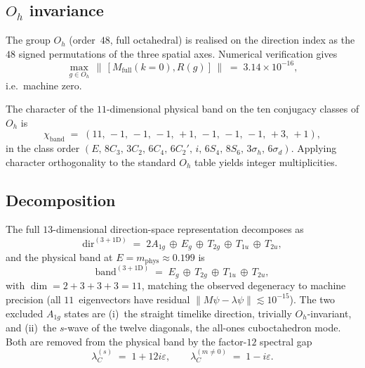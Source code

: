 \documentclass[twocolumn,showpacs,preprintnumbers,amsmath,amssymb]{revtex4-2}
\newcommand{\eps}{\varepsilon}
\newcommand{\mphys}{m_{\mathrm{phys}}}
\newcommand{\Oh}{O_{h}}
\begin{document}
\subsection{$\Oh$ invariance}

The group $\Oh$ (order~$48$, full octahedral) is realised on the direction
index as the $48$ signed permutations of the three spatial axes.
Numerical verification gives
\begin{equation}
  \max_{g\in\Oh}\,\bigl\lVert\,[M_{\mathrm{full}}(k=0),R(g)]\,\bigr\rVert
  \;=\; 3.14\times 10^{-16},
\end{equation}
i.e.\ machine zero.

The character of the $11$-dimensional physical band on the ten conjugacy
classes of $\Oh$ is
\begin{equation}
  \chi_{\text{band}} \;=\;
    (11,\,-1,\,-1,\,-1,\,+1,\,-1,\,-1,\,-1,\,+3,\,+1),
\end{equation}
in the class order $(E,\,8C_{3},\,3C_{2},\,6C_{4},\,6C_{2}',\,i,\,6S_{4},
\,8S_{6},\,3\sigma_{h},\,6\sigma_{d})$.
Applying character orthogonality to the standard $\Oh$ table yields
integer multiplicities.

\subsection{Decomposition}

The full $13$-dimensional direction-space representation decomposes as
\begin{equation}
  \text{dir}^{(3+1\mathrm{D})} \;=\;
    2A_{1g}\,\oplus\,E_{g}\,\oplus\,T_{2g}\,\oplus\,T_{1u}\,\oplus\,T_{2u},
  \label{eq:dir-3d}
\end{equation}
and the physical band at $E=\mphys\approx 0.199$ is
\begin{equation}
  \boxed{\;
  \text{band}^{(3+1\mathrm{D})}
    \;=\; E_{g}\,\oplus\,T_{2g}\,\oplus\,T_{1u}\,\oplus\,T_{2u},
  \;}
  \label{eq:band-3d}
\end{equation}
with $\dim = 2+3+3+3 = 11$, matching the observed degeneracy to machine
precision (all $11$~eigenvectors have residual
$\lVert M\psi-\lambda\psi\rVert\lesssim 10^{-15}$).
The two excluded $A_{1g}$ states are (i)~the straight timelike direction,
trivially $\Oh$-invariant, and (ii)~the $s$-wave of the twelve diagonals,
the all-ones cuboctahedron mode.
Both are removed from the physical band by the factor-$12$ spectral gap
\begin{equation}
  \lambda_{C}^{(s)} \;=\; 1+12i\eps,
  \qquad
  \lambda_{C}^{(m\neq 0)} \;=\; 1-i\eps.
\end{equation}
\end{document}
